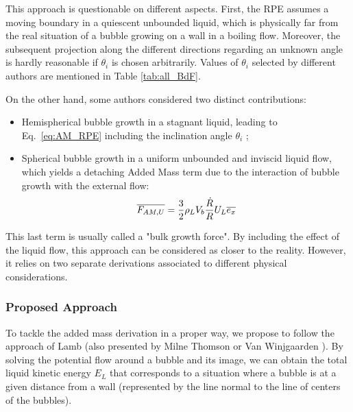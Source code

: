 This approach is questionable on different aspects. First, the RPE assumes a moving boundary in a quiescent unbounded liquid, which is physically far from the real situation of a bubble growing on a wall in a boiling flow. Moreover, the subsequent projection along the different directions regarding an unknown angle is hardly reasonable if $\theta_{i}$ is chosen arbitrarily. Values of $\theta_{i}$ selected by different authors are mentioned in Table \ref{tab:all_BdF}.

\npar

On the other hand, some authors \cite{klausner_vapor_1993, thorncroft_bubble_2001, guan_bubble_2015} considered two distinct contributions: 

\begin{itemize}

\item Hemispherical bubble growth in a stagnant liquid, leading to Eq.~\ref{eq:AM_RPE} including the inclination angle $\theta_{i}$ ;
\item Spherical bubble growth in a uniform unbounded and inviscid liquid flow, which yields a detaching Added Mass term  due to the interaction of bubble growth with the external flow: 
\begin{equation}
\overline{F_{AM,U}}= \frac{3}{2}\rho_{L}V_{b}\frac{\dot{R}}{R}U_{L} \overline{e_{x}} 
\label{eq:AM_bulk}
\end{equation} 

\end{itemize}

This last term is usually called a "bulk growth force". By including the effect of the liquid flow, this approach can be considered as closer to the reality. However, it relies on two separate derivations associated to different physical considerations.



\subsubsection{Proposed Approach}
\label{subsubsec:new_AM}

To tackle the added mass derivation in a proper way, we propose to follow the approach of Lamb \cite{lamb_hydrodynamics_1895} (also presented by Milne Thomson \cite{milne-thomson_theoretical_1938} or Van Winjgaarden \cite{wijngaarden_hydrodynamic_1976}). By solving the potential flow around a bubble and its image, we can obtain the total liquid kinetic energy $E_{L}$ that corresponds to a situation where a bubble is at a given distance from a wall (represented by the line normal to the line of centers of the bubbles). 

